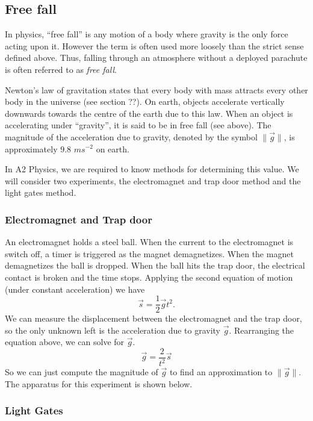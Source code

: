 \subsection{Free fall}

In physics, ``free fall'' is any motion of a body where gravity is the only force acting upon it. However the term is often used more loosely than the strict sense defined above. Thus, falling through an atmosphere without a deployed parachute is often referred to as \textit{free fall}. 

Newton's law of gravitation states that every body with mass attracts every other body in the universe  (see section ??). On earth, objects accelerate vertically downwards towards the centre of the earth due to this law. When an object is accelerating under ``gravity'', it is said to be in free fall (see above). The magnitude of the acceleration due to gravity, denoted by the symbol $\| \vec{g} \|$, is approximately $9.8$ $ms^{-2}$ on earth.   

In A2 Physics, we are required to know methods for determining this value. We will consider two experiments, the electromagnet and trap door method and the light gates method. 

\subsubsection{Electromagnet and Trap door}

An electromagnet holds a steel ball. When the current to the electromagnet is switch off, a timer is triggered as the magnet demagnetizes. When the magnet demagnetizes the ball is dropped. When the ball hits the trap door, the electrical contact is broken and the time stops. Applying the second equation of motion (under constant acceleration) we have  
\begin{equation}
    \vec{s} = \frac{1}{2}\vec{g}t^2.
\end{equation}
We can measure the displacement between the electromagnet and the trap door, so the only unknown left is the acceleration due to gravity $\vec{g}$. Rearranging the equation above, we can solve for $\vec{g}$.
\begin{equation}
    \vec{g} = \frac{2}{t^2}\vec{s}
\end{equation}
So we can just compute the magnitude of $\vec{g}$ to find an approximation to $\| \vec{g} \|$. The apparatus for this experiment is shown below. 

\subsubsection{Light Gates}

